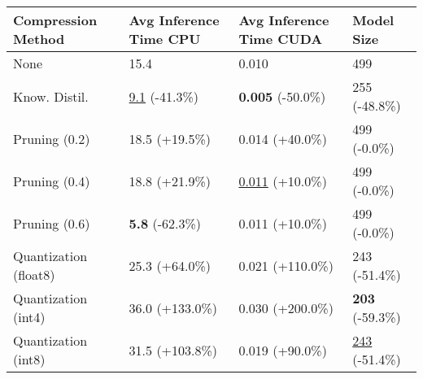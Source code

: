 \begin{tabular}{llll}
\toprule
\textbf{Compression Method} & \textbf{Avg Inference Time CPU} & \textbf{Avg Inference Time CUDA} & \textbf{Model Size} \\
\midrule
None & 15.4 & 0.010 & 499 \\
Know. Distil. & \underline{9.1} (-41.3\%) & \textbf{0.005} (-50.0\%) & 255 (-48.8\%) \\
Pruning (0.2) & 18.5 (+19.5\%) & 0.014 (+40.0\%) & 499 (-0.0\%) \\
Pruning (0.4) & 18.8 (+21.9\%) & \underline{0.011} (+10.0\%) & 499 (-0.0\%) \\
Pruning (0.6) & \textbf{5.8} (-62.3\%) & 0.011 (+10.0\%) & 499 (-0.0\%) \\
Quantization (float8) & 25.3 (+64.0\%) & 0.021 (+110.0\%) & 243 (-51.4\%) \\
Quantization (int4) & 36.0 (+133.0\%) & 0.030 (+200.0\%) & \textbf{203} (-59.3\%) \\
Quantization (int8) & 31.5 (+103.8\%) & 0.019 (+90.0\%) & \underline{243} (-51.4\%) \\
\bottomrule
\end{tabular}
